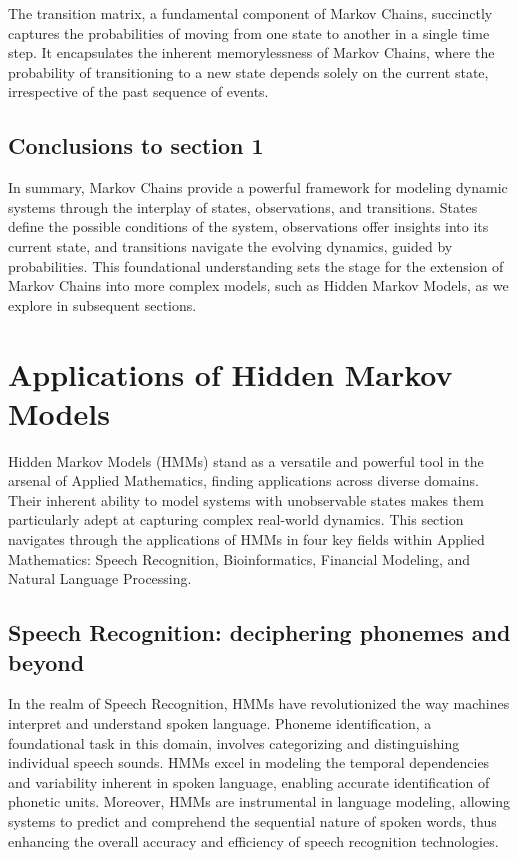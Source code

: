 \documentclass{englishreport}
\begin{document}
The transition matrix, a fundamental component of Markov Chains, succinctly captures the probabilities of moving from one state to another in a single time step. It encapsulates the inherent memorylessness of Markov Chains, where the probability of transitioning to a new state depends solely on the current state, irrespective of the past sequence of events.

\subsection{Conclusions to section 1}

In summary, Markov Chains provide a powerful framework for modeling dynamic systems through the interplay of states, observations, and transitions. States define the possible conditions of the system, observations offer insights into its current state, and transitions navigate the evolving dynamics, guided by probabilities. This foundational understanding sets the stage for the extension of Markov Chains into more complex models, such as Hidden Markov Models, as we explore in subsequent sections.

\newpage
\section{Applications of Hidden Markov Models}

Hidden Markov Models (HMMs) stand as a versatile and powerful tool in the arsenal of Applied Mathematics, finding applications across diverse domains. Their inherent ability to model systems with unobservable states makes them particularly adept at capturing complex real-world dynamics. This section navigates through the applications of HMMs in four key fields within Applied Mathematics: Speech Recognition, Bioinformatics, Financial Modeling, and Natural Language Processing.

\subsection{Speech Recognition: deciphering phonemes and beyond}

In the realm of Speech Recognition, HMMs have revolutionized the way machines interpret and understand spoken language. Phoneme identification, a foundational task in this domain, involves categorizing and distinguishing individual speech sounds. HMMs excel in modeling the temporal dependencies and variability inherent in spoken language, enabling accurate identification of phonetic units. Moreover, HMMs are instrumental in language modeling, allowing systems to predict and comprehend the sequential nature of spoken words, thus enhancing the overall accuracy and efficiency of speech recognition technologies.
\end{document}
